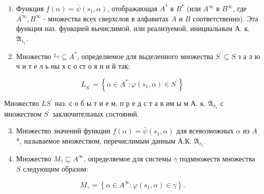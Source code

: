 \documentclass[10pt]{article}
\begin{document}
\begin{enumerate}

  \item Функция $f(\alpha)=\bar{\psi}\left(s_{1}, \alpha\right)$, отображающая $A^{*}$ в $B^{*}$ (или $A^{\infty}$ в $B^{\infty}$, где $A^{\infty}, B^{\infty}$ - множества всех сверхслов в алфавитах $A$ и $B$ соответственно). Эта функция наз. функцией вычислимой, или реализуемой, инициальным А. к. $\mathfrak{A}_{s_{1}}$.



  \item Множество $\stackrel{L_{S}}{ } \subseteq A^{*}$, определяемое для выделенного множества $S^{\prime} \subseteq S$ з а л ю ч и т е л ь ны х с о ст о я н и й так:



\end{enumerate}



\[

L_{S^{\prime}}=\left\{\alpha \in A^{*}: \varphi\left(s_{1}, \alpha\right) \in S^{\prime}\right\}

\]



Множество $L S^{\prime}$ наз. с о б ы т и е м, п р е д с т а в им ы м А. к. $\mathfrak{A}_{s_{1}}$ с множеством $S^{\prime}$ заключительных состояний.



\begin{enumerate}

  \setcounter{enumi}{2}

  \item Множество значений функции $f(\alpha)=\bar{\psi}\left(s_{1}, \alpha\right)$ для всевозможных $\alpha$ из $A$ *, называемое множеством, перечислимым данным А.К. $\mathfrak{A}_{s_{1}}$.



  \item Множество $M_{\gamma} \sqsubseteq A^{\infty}$, определяемое для системы $\gamma$ подмножеств множества $S$ следующим образом:



\end{enumerate}



\[

M_{\gamma}=\left\{\alpha \in A^{\infty}: \varphi\left(s_{1}, \alpha\right) \in \gamma\right\} .

\]
\end{document}
